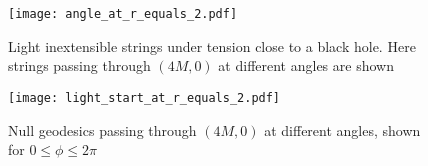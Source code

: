 \documentclass[review]{elsarticle}
\begin{document}
\begin{figure}[p]
\centering
\texttt{[image: angle\_at\_r\_equals\_2.pdf]} %
\caption{Light inextensible strings under tension close to a black
  hole.  Here strings passing through $(4M,0)$ at different angles are
  shown}
\label{strings_r_equals_2}
\end{figure}

\begin{figure}[p]
\centering
\texttt{[image: light\_start\_at\_r\_equals\_2.pdf]} %
\caption{Null geodesics passing through $(4M,0)$ at different angles,
  shown for $0\leqslant\phi\leqslant 2\pi$}
\label{light_r_equals_2}
\end{figure}
\end{document}
